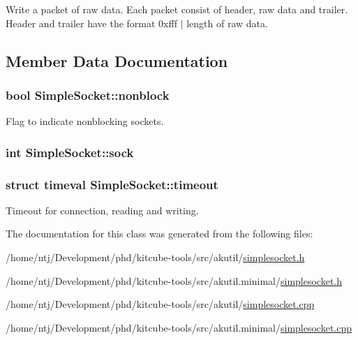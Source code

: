 Write a packet of raw data. Each packet consist of header, raw data and trailer. Header and trailer have the format 0xfff $|$ length of raw data. 

\subsection{Member Data Documentation}
\hypertarget{classSimpleSocket_abbc193b9005628c260a53e864e6785cb}{
\subsubsection[{nonblock}]{\setlength{\rightskip}{0pt plus 5cm}bool Simple\-Socket\-::nonblock\hspace{0.3cm}{\ttfamily [private]}}}\label{classSimpleSocket_abbc193b9005628c260a53e864e6785cb}
Flag to indicate nonblocking sockets. \hypertarget{classSimpleSocket_a23557ce4b09fc521787340f38126b92e}{
\subsubsection[{sock}]{\setlength{\rightskip}{0pt plus 5cm}int Simple\-Socket\-::sock\hspace{0.3cm}{\ttfamily [private]}}}\label{classSimpleSocket_a23557ce4b09fc521787340f38126b92e}
\hypertarget{classSimpleSocket_ac2e777bd36689f4f136b9c5b9e9c5f0e}{
\subsubsection[{timeout}]{\setlength{\rightskip}{0pt plus 5cm}struct timeval Simple\-Socket\-::timeout\hspace{0.3cm}{\ttfamily [private]}}}\label{classSimpleSocket_ac2e777bd36689f4f136b9c5b9e9c5f0e}
Timeout for connection, reading and writing. 

The documentation for this class was generated from the following files\-:\begin{DoxyCompactItemize}
\item 
/home/ntj/\-Development/phd/kitcube-\/tools/src/akutil/\hyperlink{simplesocket_8h}{simplesocket.\-h}\item 
/home/ntj/\-Development/phd/kitcube-\/tools/src/akutil.\-minimal/\hyperlink{minimal_2simplesocket_8h}{simplesocket.\-h}\item 
/home/ntj/\-Development/phd/kitcube-\/tools/src/akutil/\hyperlink{simplesocket_8cpp}{simplesocket.\-cpp}\item 
/home/ntj/\-Development/phd/kitcube-\/tools/src/akutil.\-minimal/\hyperlink{minimal_2simplesocket_8cpp}{simplesocket.\-cpp}\end{DoxyCompactItemize}

